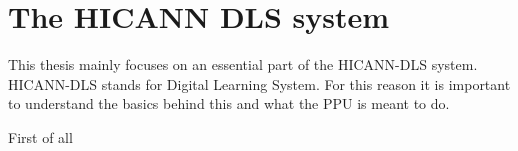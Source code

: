 \chapter{The HICANN DLS system}
\label{chapter:hicann}

This thesis mainly focuses on an essential part of the HICANN-DLS system.
HICANN-DLS stands for  Digital Learning System.
For this reason it is important to understand the basics behind this and what the PPU is meant to do.

First of all 

